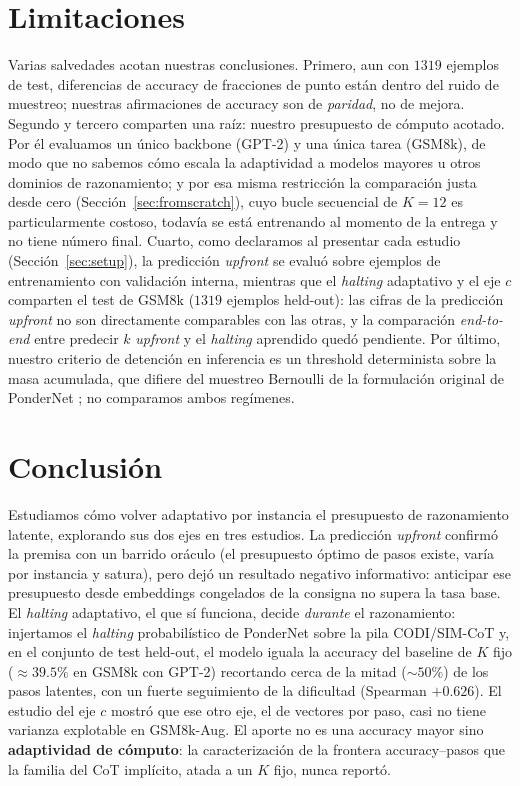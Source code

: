 \documentclass[11pt]{article}
\begin{document}
\section*{Limitaciones}

Varias salvedades acotan nuestras conclusiones. Primero, aun con $1319$ ejemplos de test, diferencias de accuracy de fracciones de punto están dentro del ruido de muestreo; nuestras afirmaciones de accuracy son de \emph{paridad}, no de mejora. Segundo y tercero comparten una raíz: nuestro presupuesto de cómputo acotado. Por él evaluamos un único backbone (GPT-2) y una única tarea (GSM8k), de modo que no sabemos cómo escala la adaptividad a modelos mayores u otros dominios de razonamiento; y por esa misma restricción la comparación justa desde cero (Sección~\ref{sec:fromscratch}), cuyo bucle secuencial de $K{=}12$ es particularmente costoso, todavía se está entrenando al momento de la entrega y no tiene número final. Cuarto, como declaramos al presentar cada estudio (Sección~\ref{sec:setup}), la predicción \textit{upfront} se evaluó sobre ejemplos de entrenamiento con validación interna, mientras que el \textit{halting} adaptativo y el eje $c$ comparten el test de GSM8k ($1319$ ejemplos held-out): las cifras de la predicción \textit{upfront} no son directamente comparables con las otras, y la comparación \textit{end-to-end} entre predecir $k$ \textit{upfront} y el \textit{halting} aprendido quedó pendiente. Por último, nuestro criterio de detención en inferencia es un threshold determinista sobre la masa acumulada, que difiere del muestreo Bernoulli de la formulación original de PonderNet \citep{banino2021pondernet}; no comparamos ambos regímenes.

\section{Conclusión}

Estudiamos cómo volver adaptativo por instancia el presupuesto de razonamiento latente, explorando sus dos ejes en tres estudios. La predicción \textit{upfront} confirmó la premisa con un barrido oráculo (el presupuesto óptimo de pasos existe, varía por instancia y satura), pero dejó un resultado negativo informativo: anticipar ese presupuesto desde embeddings congelados de la consigna no supera la tasa base. El \textit{halting} adaptativo, el que sí funciona, decide \emph{durante} el razonamiento: injertamos el \textit{halting} probabilístico de PonderNet sobre la pila CODI/SIM-CoT y, en el conjunto de test held-out, el modelo iguala la accuracy del baseline de $K$ fijo ($\approx 39.5\%$ en GSM8k con GPT-2) recortando cerca de la mitad ($\sim 50\%$) de los pasos latentes, con un fuerte seguimiento de la dificultad (Spearman $+0.626$). El estudio del eje $c$ mostró que ese otro eje, el de vectores por paso, casi no tiene varianza explotable en GSM8k-Aug. El aporte no es una accuracy mayor sino \textbf{adaptividad de cómputo}: la caracterización de la frontera accuracy--pasos que la familia del CoT implícito, atada a un $K$ fijo, nunca reportó.


\end{document}
